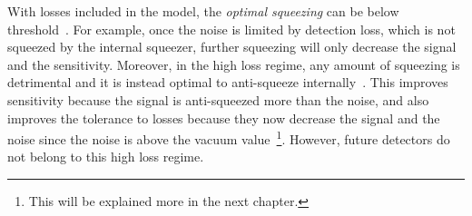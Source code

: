 With losses included in the model, the \emph{optimal squeezing} can be below threshold~\cite{korobkoCompensatingQuantumDecoherenceTalk2021}. For example, once the noise is limited by detection loss, which is not squeezed by the internal squeezer, further squeezing will only decrease the signal and the sensitivity. Moreover, in the high loss regime, any amount of squeezing is detrimental and it is instead optimal to anti-squeeze internally~\cite{korobkoCompensatingQuantumDecoherenceTalk2021}. This improves sensitivity because the signal is anti-squeezed more than the noise, and also improves the tolerance to losses because they now decrease the signal and the noise since the noise is above the vacuum value~\footnote{This will be explained more in the next chapter.}. However, future detectors do not belong to this high loss regime. %


